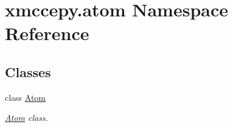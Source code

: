 \hypertarget{namespacexmccepy_1_1atom}{\section{xmccepy.\-atom Namespace Reference}
\label{namespacexmccepy_1_1atom}
}
\subsection*{Classes}
\begin{DoxyCompactItemize}
\item 
class \hyperlink{classxmccepy_1_1atom_1_1_atom}{Atom}
\begin{DoxyCompactList}\small\item\em \hyperlink{classxmccepy_1_1atom_1_1_atom}{Atom} class. \end{DoxyCompactList}\end{DoxyCompactItemize}
